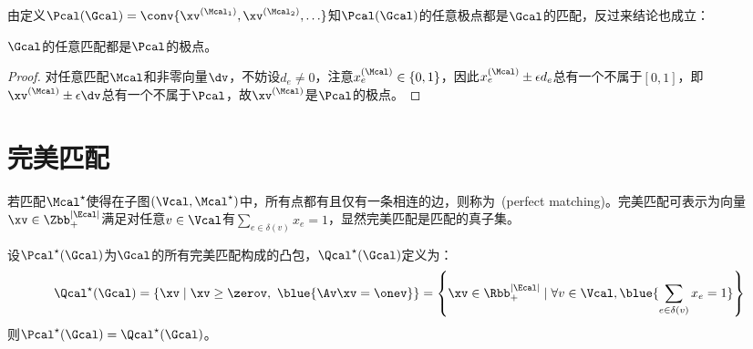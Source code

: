 \documentclass{ctexart}
\begin{document}
由定义$\Pcal (\Gcal) = \conv \{ \xv^{(\Mcal_1)}, \xv^{(\Mcal_2)}, \ldots \}$知$\Pcal (\Gcal)$的任意极点都是$\Gcal$的匹配，反过来结论也成立：

\begin{theorem} \label{thm: extreme-point-matching}
    $\Gcal$的任意匹配都是$\Pcal$的极点。
\end{theorem}

\begin{proof}
    对任意匹配$\Mcal$和非零向量$\dv$，不妨设$d_e \neq 0$，注意$x^{(\Mcal)}_e \in \{0, 1\}$，因此$x^{(\Mcal)}_e \pm \epsilon d_e$总有一个不属于$[0,1]$，即$\xv^{(\Mcal)} \pm \epsilon \dv$总有一个不属于$\Pcal$，故$\xv^{(\Mcal)}$是$\Pcal$的极点。
\end{proof}

\section{完美匹配}

若匹配$\Mcal^\star$使得在子图$(\Vcal, \Mcal^\star)$中，所有点都有且仅有一条相连的边，则称为~(perfect matching)。完美匹配可表示为向量$\xv \in \Zbb_+^{|\Ecal|}$满足对任意$v \in \Vcal$有$\sum_{e \in \delta(v)} x_e = 1$，显然完美匹配是匹配的真子集。

\begin{theorem}
    设$\Pcal^\star (\Gcal)$为$\Gcal$的所有完美匹配构成的凸包，$\Qcal^\star (\Gcal)$定义为：
    \begin{align*}
        \Qcal^\star (\Gcal) = \{ \xv \mid \xv \ge \zerov, ~ \blue{\Av \xv = \onev} \} = \left\{ \xv \in \Rbb_+^{|\Ecal|} \mid \forall v \in \Vcal, \blue{\sum_{e \in \delta(v)} x_e = 1} \right\}
    \end{align*}
    则$\Pcal^\star (\Gcal) = \Qcal^\star (\Gcal)$。
\end{theorem}
\end{document}
